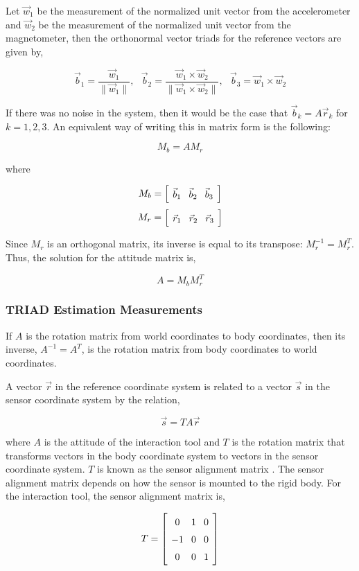 \documentclass{article}
\newcommand{\mat}[2][ccccccccccccccccccccccccccccccccccccccccccccc]{\left[
        \arraycolsep=4pt\def\arraystretch{1.5}
        \begin{array}{#1} #2 \\ 
        \end{array} 
        \right]}
\newcommand{\tab}{ \textrm{ \ \ \ \ } }
\begin{document}
\begin{flushleft}
Let $\vec{w}_1$ be the measurement of the normalized unit vector from the accelerometer and $\vec{w}_2$ be the measurement of the normalized unit vector from the magnetometer, then the orthonormal vector triads for the reference vectors are given by, 

$$ \vec{b}_1 = \frac{\vec{w}_1}{\| \vec{w}_1 \|}, \tab \vec{b}_2 = \frac{\vec{w}_1 \times \vec{w}_2}{\| \vec{w}_1 \times \vec{w}_2 \|}, \tab \vec{b}_3 = \vec{w}_1 \times \vec{w}_2 $$

If there was no noise in the system, then it would be the case that $\vec{b}_k = A \vec{r}_k$ for $k=1,2,3$. An equivalent way of writing this in matrix form is the following: 

$$ M_b = A M_r $$ 

where 

$$ M_b = \mat{ \vec{b}_1 & \vec{b}_2 & \vec{b}_3 } $$
$$ M_r = \mat{ \vec{r}_1 & \vec{r}_2 & \vec{r}_3 } $$

Since $M_r$ is an orthogonal matrix, its inverse is equal to its transpose: $M_r^{-1} = M_r^{T}$. Thus, the solution for the attitude matrix is, 

$$ A = M_b M_r^{T} $$

\subsubsection{TRIAD Estimation Measurements}

If $A$ is the rotation matrix from world coordinates to body coordinates, then its inverse, $A^{-1} = A^{T}$, is the rotation matrix from body coordinates to world coordinates.

\medskip

A vector $\vec{r}$ in the reference coordinate system is related to a vector $\vec{s}$ in the sensor coordinate system by the relation, 

$$ \vec{s} = T A \vec{r} $$

where $A$ is the attitude of the interaction tool and $T$ is the rotation matrix that transforms vectors in the body coordinate system to vectors in the sensor coordinate system. $T$ is known as the sensor alignment matrix \cite{Shuster2004}. The sensor alignment matrix depends on how the sensor is mounted to the rigid body. For the interaction tool, the sensor alignment matrix is, 

$$ T = \mat{0 & 1 & 0 \\ -1 & 0 & 0 \\ 0 & 0 & 1} $$


\end{flushleft}
\end{document}
